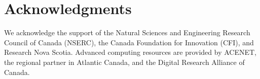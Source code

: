 \documentclass{article} %
\begin{document}
\section*{Acknowledgments}
We acknowledge the support of the Natural Sciences and Engineering Research Council of Canada (NSERC), the Canada Foundation for Innovation (CFI), and Research Nova Scotia. Advanced computing resources are provided by ACENET, the regional partner in Atlantic Canada, and the Digital Research Alliance of Canada.




\appendix

\end{document}
